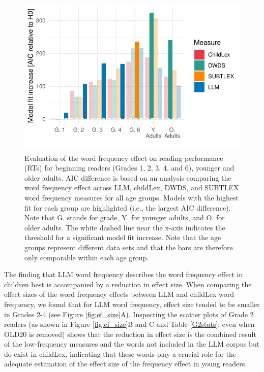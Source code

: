 \documentclass[doc, a4paper, anonymous]{apa7}
\begin{document}
\begin{figure}[!htbp]
    \centering
    \includegraphics[scale=1]{figures/exp1_modelcomp.pdf}
    \caption{Evaluation of the word frequency effect on reading performance (RTs) for beginning readers (Grades 1, 2, 3, 4, and 6), younger and older adults. AIC difference is based on an analysis comparing the word frequency effect across LLM, childLex, DWDS, and SUBTLEX word frequency measures for all age groups. Models with the highest fit for each group are highlighted (i.e., the largest AIC difference). Note that G. stands for grade, Y. for younger adults, and O. for older adults. The white dashed line near the x-axis indicates the threshold for a significant model fit increase. Note that the age groups represent different data sets and that the bars are therefore only comparable within each age group.}
\label{fig:modelcomprt}
\end{figure}

The finding that LLM word frequency describes the word frequency effect in children best is accompanied by a reduction in effect size. When comparing the effect sizes of the word frequency effects between LLM and childLex word frequency, we found that for LLM word frequency, effect size tended to be smaller in Grades 2-4 (see Figure \ref{fig:ef_size}A). Inspecting the scatter plots of Grade 2 readers (as shown in Figure \ref{fig:ef_size}B and C and Table \ref{G2stats}; even when OLD20 is removed) shows that the reduction in effect size is the combined result of the low-frequency measures and the words not included in the LLM corpus but do exist in childLex, indicating that these words play a crucial role for the adequate estimation of the effect size of the frequency effect in young readers.
\end{document}
